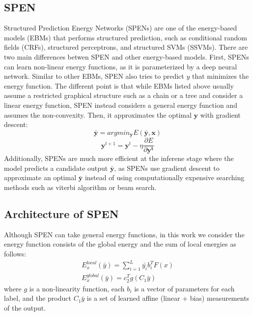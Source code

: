 \documentclass[11pt,letterpaper]{article}
\begin{document}
\subsection{SPEN}
Structured Prediction Energy Networks (SPENs) \cite{DBLP:journals/corr/BelangerM15}\cite{belanger2017end} are one of the energy-based models (EBMs) that performs structured prediction, such as conditional random fields (CRFs), structured perceptrons, and structured SVMs (SSVMs).
There are two main differences betwen SPEN and other energy-based models. First, SPENs can learn non-linear energy functions, as it is parameterized by a deep neural network. Similar to other EBMs, SPEN also tries to predict $y$ that minimizes the energy function. The different point is that while EBMs listed above usually assume a restricted graphical structure such as a chain or a tree and consider a linear energy function, SPEN instead considers a general energy function and assumes the non-convexity. Then, it approximates the optimal $\mathbf{y}$ with gradient descent:
\begin{equation}
\mathbf{\bar{y}} = argmin_{\mathbf{\bar{y}}} E( \mathbf{\bar{y}}, \mathbf{x} )
\end{equation}
\begin{equation}
\mathbf{y}^{t+1} = \mathbf{y}^t - \eta \frac{ \partial E }{ \partial \mathbf{y^t}}
\end{equation}
Additionally, SPENs are much more efficient at the inferene stage where the model predicts a candidate output $\bar{\mathbf{y}}$, as SPENs use gradient descent to approximate an optimal $\bar{\mathbf{y}}$ instead of using computationally expensive searching methods such as viterbi algorithm or beam search.
\subsection{Architecture of SPEN}
Although SPEN can take general energy functions, in this work we consider the energy function consists of the global energy and the sum of local energies as follows:
\begin{align}
E_x^{local}(\bar{y}) = \sum^L_{i=1} \bar{y_i} b_i^T F(x) \\
E_x^{global}(\bar{y}) = c_2^T g(C_1 \bar{y})
\end{align}
where $g$ is a non-linearity function, each $b_i$ is a vector of parameters for each label, and the product $C_1 \bar{y}$ is a set of learned affine (linear + bias)
measurements of the output.
\end{document}
